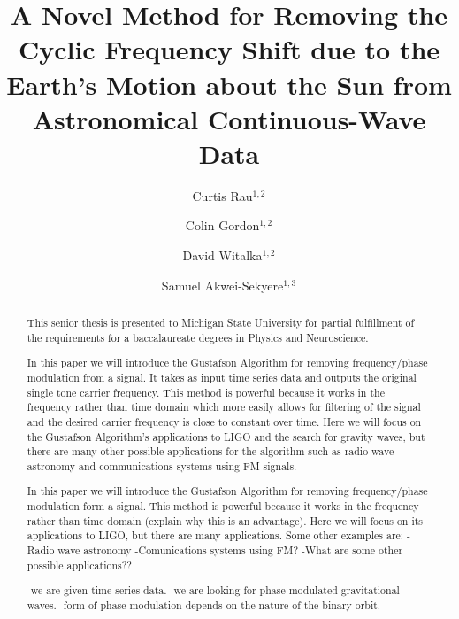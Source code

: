 \documentclass[onecolumn, groupedaddress, 10pt]{revtex4-1}
\begin{document}
\author{Curtis Rau$^{1,2}$}
\author{Colin Gordon$^{1,2}$}
\author{David Witalka$^{1,2}$}
\author{Samuel Akwei-Sekyere$^{1,3}$}

\title{A Novel Method for Removing the Cyclic Frequency Shift due to the Earth's Motion about the Sun from Astronomical Continuous-Wave Data}


\begin{abstract}
This senior thesis is presented to Michigan State University for partial fulfillment of the requirements for a baccalaureate degrees in Physics and Neuroscience.

In this paper we will introduce the Gustafson Algorithm for removing frequency/phase modulation from a signal.  It takes as input time series data and outputs the original single tone carrier frequency. This method is powerful because it works in the frequency rather than time domain which more easily allows for filtering of the signal and the desired carrier frequency is close to constant over time. Here we will focus on the Gustafson Algorithm's applications to LIGO and the search for gravity waves, but there are many other possible applications for the algorithm such as radio wave astronomy and communications systems using FM signals.

In this paper we will introduce the Gustafson Algorithm for removing frequency/phase modulation form a signal.  This method is powerful because it works in the frequency rather than time domain (explain why this is an advantage).  Here we will focus on its applications to LIGO, but there are many applications.  Some other examples are:
-Radio wave astronomy
-Comunications systems using FM?
-What are some other possible applications??

-we are given time series data.
-we are looking for phase modulated gravitational waves.
-form of phase modulation depends on the nature of the binary orbit.
\citep{Saulson}
\citep{LSCall}
\citep{Deanna}
\citep{folland}
\citep{griffiths}
\end{abstract}

\maketitle
\end{document}
